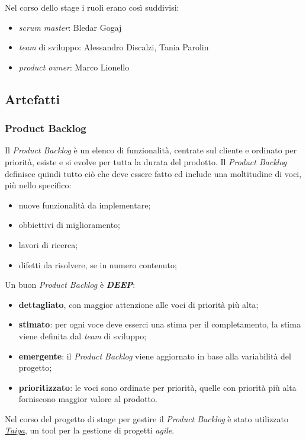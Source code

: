 Nel corso dello stage i ruoli erano così suddivisi:
\begin{itemize}
    \item \textit{scrum master}: Bledar Gogaj
    \item \textit{team} di sviluppo: Alessandro Discalzi, Tania Parolin
    \item \textit{product owner}: Marco Lionello
\end{itemize}

\subsection{Artefatti}

\subsubsection{Product Backlog}
Il \textit{Product Backlog} è un elenco di funzionalità, centrate sul cliente e ordinato per priorità, esiste e si evolve per tutta la durata del prodotto. Il \textit{Product Backlog} definisce quindi tutto ciò che deve essere fatto ed include una moltitudine di voci, più nello specifico:
\begin{itemize}
    \item nuove funzionalità da implementare;
    \item obbiettivi di miglioramento;
    \item lavori di ricerca;
    \item difetti da risolvere, se in numero contenuto;
\end{itemize}
Un buon \textit{Product Backlog} è \textit{\textbf{DEEP}}:
\begin{itemize}
    \item \textbf{dettagliato}, con maggior attenzione alle voci di priorità più alta;
    \item \textbf{stimato}: per ogni voce deve esserci una stima per il completamento, la stima viene definita dal \textit{team} di sviluppo;
    \item \textbf{emergente}: il \textit{Product Backlog} viene aggiornato in base alla variabilità del progetto;
    \item \textbf{prioritizzato}: le voci sono ordinate per priorità, quelle con priorità più alta forniscono maggior valore al prodotto.
\end{itemize}
Nel corso del progetto di stage per gestire il \textit{Product Backlog} è stato utilizzato \textit{\href{https://taiga.io/}{Taiga}}, un tool per la gestione di progetti \textit{agile}.
